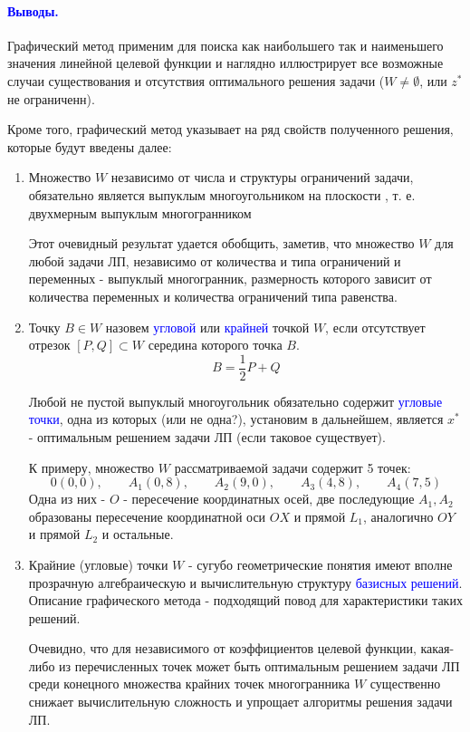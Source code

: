 \documentclass[14pt, letterpaper]{article}
\begin{document}
\paragraph{\textcolor{blue}{Выводы.}}

Графический метод применим для поиска как наибольшего так и наименьшего значения линейной целевой функции и наглядно иллюстрирует все возможные случаи существования и отсутствия оптимального решения задачи ($W \neq \emptyset$, или $z^{*}$ не ограниченн).

Кроме того, графический метод указывает на ряд свойств полученного решения, которые будут введены далее:
\begin{enumerate}
    \item Множество $W$ независимо от числа и структуры ограничений задачи, обязательно является выпуклым многоугольником на плоскости , т. е. двухмерным выпуклым многогранником  

    Этот очевидный результат удается обобщить, заметив, что множество $W$ для любой задачи ЛП, независимо от количества и типа  ограничений и переменных - выпуклый многогранник, размерность которого зависит от количества переменных и количества ограничений типа равенства.
    
    \item Точку $B \in W$ назовем \textcolor{blue}{угловой} или \textcolor{blue}{крайней} точкой $W$, если отсутствует отрезок $[P, Q] \subset W$ середина которого точка $B$.
    $$ B = \frac{1}{2}P + Q$$

    Любой не пустой выпуклый многоугольник обязательно содержит \textcolor{blue}{угловые точки}, одна из которых (или не одна?), установим в дальнейшем, является $x^{*}$ - оптимальным решением задачи ЛП (если таковое существует).

    К примеру, множество $W$ рассматриваемой задачи содержит 5 точек:
    $$0(0, 0),\qquad A_{1}(0, 8),\qquad A_{2}(9, 0),\qquad A_{3}(4, 8),\qquad A_{4}(7, 5)$$
    Одна из них - $O$ - пересечение координатных осей, две последующие $A_{1}, A_{2}$ образованы пересечение координатной оси $OX$ и прямой $L_{1}$, аналогично $OY$ и прямой $L_{2}$ и остальные.
    
    \item Крайние (угловые) точки $W$ - сугубо геометрические понятия имеют вполне прозрачную алгебраическую и вычислительную структуру \textcolor{blue}{базисных решений}. Описание графического метода - подходящий повод для характеристики таких решений.

    Очевидно, что для независимого от коэффициентов целевой функции, какая-либо из перечисленных точек может быть оптимальным решением задачи ЛП среди конецного множества крайних точек многогранника $W$ существенно снижает вычислительную сложность и упрощает алгоритмы решения задачи ЛП.


\end{enumerate}
\end{document}
